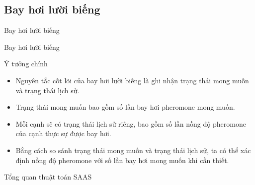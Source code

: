 \documentclass[aspectratio=169]{beamer}
\begin{document}
\subsection{Bay hơi lười biếng}
\begin{frame}{Bay hơi lười biếng}
    \vspace{0.1cm}
    \centering
    
\end{frame}

\begin{frame}{Bay hơi lười biếng}
    \begin{block}{Ý tưởng chính}
        \begin{itemize}
            \justifying
            \vspace{0.1cm}
            \item Nguyên tắc cốt lõi của bay hơi lười biếng là ghi nhận trạng thái mong muốn và trạng thái lịch sử.
            \vspace{0.1cm}
            \item Trạng thái mong muốn bao gồm số lần bay hơi pheromone mong muốn.
            \vspace{0.1cm}
            \item Mỗi cạnh sẽ có trạng thái lịch sử riêng, bao gồm số lần nồng độ pheromone của cạnh thực sự được bay hơi.
            \vspace{0.1cm}
            \item Bằng cách so sánh trạng thái mong muốn và trạng thái lịch sử, ta có thể xác định nồng độ pheromone với số lần bay hơi mong muốn khi cần thiết.
            \vspace{0.1cm}
        \end{itemize}
    \end{block}
\end{frame}

\begin{frame}{Tổng quan thuật toán SAAS}
    \vspace{0.1cm}
    \centering
    
\end{frame}
\end{document}
